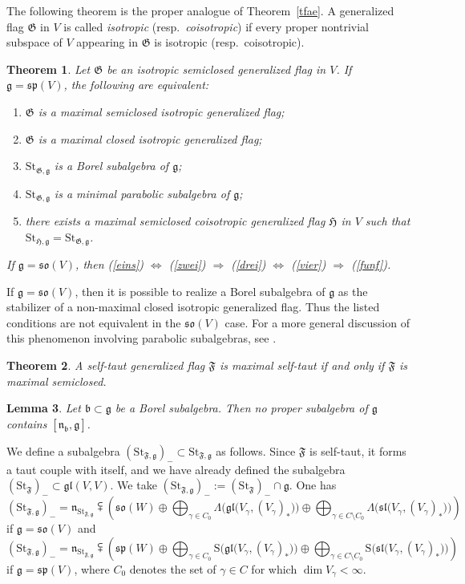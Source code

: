 \documentclass{article}
\newcommand {\St} {\mathrm{St}}
\def\b{\mathfrak {b}}
\def\gl{\mathfrak {gl}}
\def\g{\mathfrak {g}}
\def\n{\mathfrak {n}}
\def\sl{\mathfrak{sl}}
\def\so{\mathfrak{so}}
\def\sp{\mathfrak{sp}}
\def\F{\mathfrak{F}}
\def\G{\mathfrak{G}}
\def\H{\mathfrak{H}}
\newtheorem{thm}{Theorem}[section]
\newtheorem{lemma}[thm]{Lemma}
\begin{document}
The following theorem is the proper analogue of Theorem~\ref{tfae}.  A generalized flag $\G$ in $V$ is called \emph{isotropic} (resp.\ \emph{coisotropic}) if every proper nontrivial subspace of $V$ appearing in $\G$ is isotropic (resp.\ coisotropic).  


\begin{thm}
Let $\G$ be an isotropic semiclosed generalized flag in $V$.  If $\g = \sp(V)$, the following are equivalent:
\begin{enumerate}
\item \label{eins} $\G$ is a maximal semiclosed isotropic generalized flag;
\item \label{zwei} $\G$ is a maximal closed isotropic generalized flag;
\item \label{drei} $\St_{\G,\g}$ is a Borel subalgebra of $\g$; 
\item \label{vier} $\St_{\G,\g}$ is a minimal parabolic subalgebra of $\g$;
\item \label{funf} there exists a  
maximal semiclosed coisotropic generalized flag $\H$ in $V$ such that $\St_{\H,\g} = \St_{\G,\g}$.
\end{enumerate}
If $\g = \so(V)$, then (\ref{eins}) $\Leftrightarrow$ (\ref{zwei}) $\Rightarrow$ (\ref{drei}) $\Leftrightarrow$ (\ref{vier}) $\Rightarrow$ (\ref{funf}).
\end{thm}


If $\g = \so(V)$, then it is possible to realize a Borel subalgebra of $\g$ as the stabilizer of a non-maximal closed isotropic generalized flag.  Thus the listed conditions are not equivalent in the $\so(V)$ case. 
For a more general discussion of this phenomenon involving parabolic subalgebras, see \cite{DPW}.


\begin{thm}
A self-taut generalized flag $\F$ is maximal self-taut if and only if $\F$ is maximal semiclosed.
\end{thm}


\begin{lemma}
Let $\b \subset \g$ be a Borel subalgebra.  Then no proper subalgebra of $\g$ contains $[\n_\b,\g]$.
\end{lemma}


We define a subalgebra $(\St_{\F,\g})_- \subset \St_{\F,\g}$ as follows.   Since $\F$ is self-taut, it forms a taut couple with itself, and we have already defined the subalgebra $(\St_\F)_- \subset \gl(V,V)$.  We take $(\St_{\F,\g})_- := (\St_\F)_- \cap \g$.
One has
$$(\St_{\F,\g})_- = \n_{\St_{\F,\g}} \subsetplus \left( 
 \so(W) \oplus \bigoplus_{\gamma \in C_0} \Lambda \big( \gl \big( V_\gamma, (V_\gamma)_* \big) \big) \oplus \bigoplus_{\gamma \in C \setminus C_0} \Lambda \big( \sl \big( V_\gamma, (V_\gamma)_* \big) \big)  \right)$$
if $\g = \so(V)$ and
$$(\St_{\F,\g})_- = \n_{\St_{\F,\g}} \subsetplus \left( \sp(W) \oplus \bigoplus_{\gamma \in C_0} \mathrm{S} \big( \gl \big( V_\gamma, (V_\gamma)_* \big) \big) \oplus \bigoplus_{\gamma \in C \setminus C_0} \mathrm{S} \big( \sl \big( V_\gamma, (V_\gamma)_* \big) \big) \right)$$
if $\g = \sp(V)$, where $C_0$ denotes the set of $\gamma \in C$ for which $\dim V_\gamma < \infty$.
\end{document}
